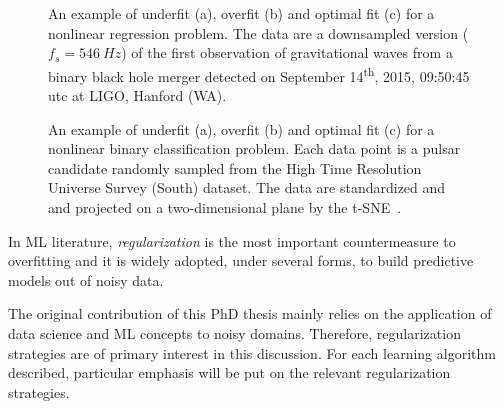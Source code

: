 	  \begin{figure}[!h]
	  	\centering
	      \hfill%
	  	\caption{An example of underfit (a), overfit (b) and optimal fit (c) for a nonlinear regression problem. The data are a downsampled version ($f_s = 546~Hz$) of the first observation of gravitational waves from a binary black hole merger detected on September 14\textsuperscript{th}, 2015, 09:50:45 {\sc utc} at LIGO, Hanford (WA).}\label{fig:regression_fit}
	  \end{figure}

	  \begin{figure}[!h]
			\centering
			\hfill%
			\caption{An example of underfit (a), overfit (b) and optimal fit (c) for a nonlinear binary classification problem. Each data point is a pulsar candidate randomly sampled from the High Time Resolution Universe Survey (South) dataset. The data are standardized and and projected on a two-dimensional plane by the \ac{t-SNE}~\cite{van2008visualizing}. }\label{fig:classification_fit}
	  \end{figure}


      In ML literature, \textit{regularization} is the most important countermeasure to overfitting and it is widely adopted, under several forms, to build predictive models out of noisy data.

	    The original contribution of this PhD thesis mainly relies on the application of data science and ML concepts to noisy domains. Therefore, regularization strategies are of primary interest in this discussion.
	    For each learning algorithm described, particular emphasis will be put on the relevant regularization strategies.

